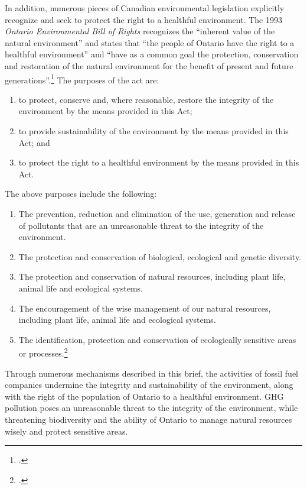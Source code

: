 \documentclass[10pt]{article}
\begin{document}
In addition, numerous pieces of Canadian environmental legislation explicitly recognize and seek to protect the right to a healthful environment.
The 1993 \emph{Ontario Environmental Bill of Rights} recognizes the ``inherent value of the natural environment'' and states that ``the people of Ontario have the right to a healthful environment'' and ``have as a common goal the protection, conservation and restoration of the natural environment for the benefit of present and future generations''.\footcite[][]{OntBillRights}
The purposes of the act are:
\begin{enumerate}
	\item to protect, conserve and, where reasonable, restore the integrity of the environment by the means provided in this Act;
	\item to provide sustainability of the environment by the means provided in this Act; and
	\item to protect the right to a healthful environment by the means provided in this Act.
\end{enumerate}
The above purposes include the following:
\begin{enumerate}
	\item The prevention, reduction and elimination of the use, generation and release of pollutants that are an unreasonable threat to the integrity of the environment.
	\item The protection and conservation of biological, ecological and genetic diversity.
	\item The protection and conservation of natural resources, including plant life, animal life and ecological systems.
	\item The encouragement of the wise management of our natural resources, including plant life, animal life and ecological systems.
	\item The identification, protection and conservation of ecologically sensitive areas or processes.\footcite[][]{OntarioEnvironmentalBillofRights}
\end{enumerate}
Through numerous mechanisms described in this brief, the activities of fossil fuel companies undermine the integrity and sustainability of the environment, along with the right of the population of Ontario to a healthful environment.
GHG pollution poses an unreasonable threat to the integrity of the environment, while threatening biodiversity and the ability of Ontario to manage natural resources wisely and protect sensitive areas.
\end{document}
